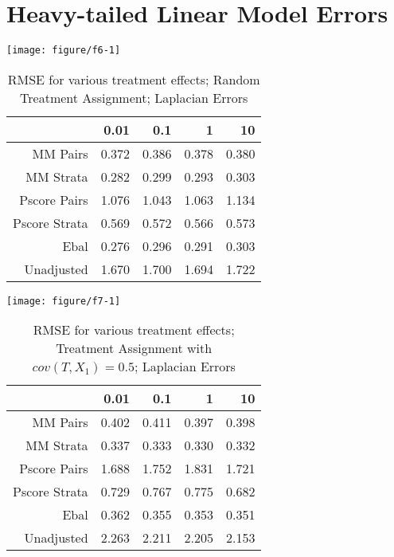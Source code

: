 \documentclass[11pt]{article}\usepackage[]{graphicx}\usepackage[]{color}
\makeatletter
\def\maxwidth{ %
  \ifdim\Gin@nat@width>\linewidth
    \linewidth
  \else
    \Gin@nat@width
  \fi
}
\newenvironment{knitrout}{}{} %
\makeatother
\begin{document}
\section{Heavy-tailed Linear Model Errors}
\begin{knitrout}
\color{fgcolor}

{\centering \texttt{[image: figure/f6-1]} 

}



\end{knitrout}
\begin{table}[ht]
\centering
\begin{tabular}{rrrrr}
  \hline
 & 0.01 & 0.1 & 1 & 10 \\ 
  \hline
MM Pairs & 0.372 & 0.386 & 0.378 & 0.380 \\ 
  MM Strata & 0.282 & 0.299 & 0.293 & 0.303 \\ 
  Pscore Pairs & 1.076 & 1.043 & 1.063 & 1.134 \\ 
  Pscore Strata & 0.569 & 0.572 & 0.566 & 0.573 \\ 
  Ebal & 0.276 & 0.296 & 0.291 & 0.303 \\ 
  Unadjusted & 1.670 & 1.700 & 1.694 & 1.722 \\ 
   \hline
\end{tabular}
\caption{RMSE for various treatment effects; Random Treatment Assignment; Laplacian Errors} 
\label{tab:f6}
\end{table}


\begin{knitrout}
\color{fgcolor}

{\centering \texttt{[image: figure/f7-1]} 

}



\end{knitrout}

\begin{table}[ht]
\centering
\begin{tabular}{rrrrr}
  \hline
 & 0.01 & 0.1 & 1 & 10 \\ 
  \hline
MM Pairs & 0.402 & 0.411 & 0.397 & 0.398 \\ 
  MM Strata & 0.337 & 0.333 & 0.330 & 0.332 \\ 
  Pscore Pairs & 1.688 & 1.752 & 1.831 & 1.721 \\ 
  Pscore Strata & 0.729 & 0.767 & 0.775 & 0.682 \\ 
  Ebal & 0.362 & 0.355 & 0.353 & 0.351 \\ 
  Unadjusted & 2.263 & 2.211 & 2.205 & 2.153 \\ 
   \hline
\end{tabular}
\caption{RMSE for various treatment effects; Treatment Assignment with $cov(T, X_1) = 0.5$; Laplacian Errors} 
\label{tab:f7}
\end{table}
\end{document}
